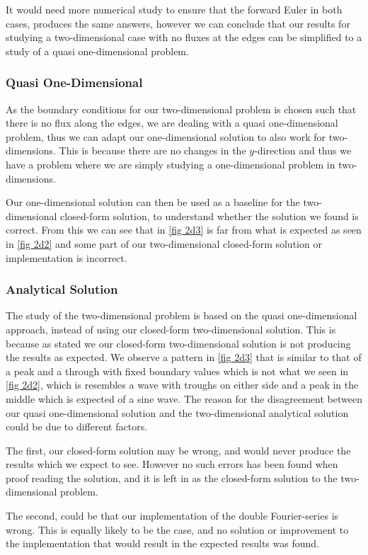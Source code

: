 \documentclass[%
reprint,
nofootinbib,
amsmath,amssymb,
aps,
]{revtex4-1}
\begin{document}
It would need more numerical study to ensure that the forward Euler in both cases, produces the same answers, however we can conclude that our results for studying a two-dimensional case with no fluxes at the edges can be simplified to a study of a quasi one-dimensional problem. 

\subsubsection{Quasi One-Dimensional}
As the boundary conditions for our two-dimensional problem is chosen such that there is no flux along the edges, we are dealing with a quasi one-dimensional problem, thus we can adapt our one-dimensional solution to also work for two-dimensions. This is because there are no changes in the $y$-direction and thus we have a problem where we are simply studying a one-dimensional problem in two-dimensions. 

Our one-dimensional solution can then be used as a baseline for the two-dimensional closed-form solution, to understand whether the solution we found is correct. From this we can see that in \autoref{fig 2d3} is far from what is expected as seen in \autoref{fig 2d2} and some part of our two-dimensional closed-form solution or implementation is incorrect. 

\subsubsection{Analytical Solution}
The study of the two-dimensional problem is based on the quasi one-dimensional approach, instead of using our closed-form two-dimensional solution. This is because as stated we our closed-form two-dimensional solution is not producing the results as expected. We observe a pattern in \autoref{fig 2d3} that is similar to that of a peak and a through with fixed boundary values which is not what we seen in \autoref{fig 2d2}, which is resembles a wave with troughs on either side and a peak in the middle which is expected of a sine wave. The reason for the disagreement between our quasi one-dimensional solution and the two-dimensional analytical solution could be due to different factors.  

The first, our closed-form solution may be wrong, and would never produce the results which we expect to see. However no such errors has been found when proof reading the solution, and it is left in as the closed-form solution to the two-dimensional problem. 

The second, could be that our implementation of the double Fourier-series is wrong. This is equally likely to be the case, and no solution or improvement to the implementation that would result in the expected results was found. 
\end{document}
